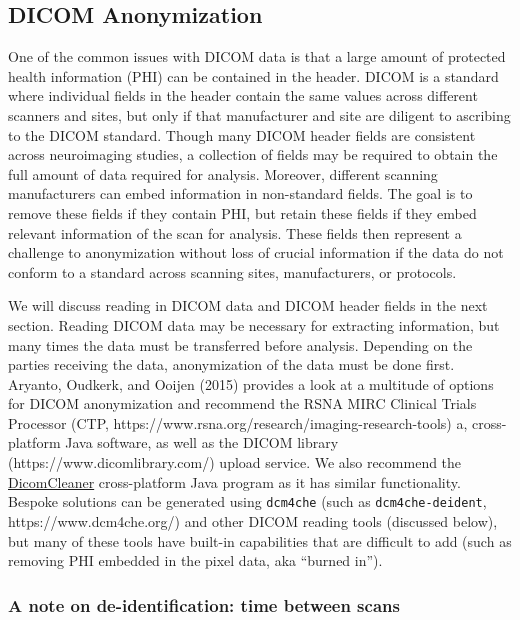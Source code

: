 \documentclass[]{elsarticle} %
\begin{document}
\hypertarget{dicom-anonymization}{%
\subsection{DICOM Anonymization}\label{dicom-anonymization}}

One of the common issues with DICOM data is that a large amount of protected health information (PHI) can be contained in the header. DICOM is a standard where individual fields in the header contain the same values across different scanners and sites, but only if that manufacturer and site are diligent to ascribing to the DICOM standard. Though many DICOM header fields are consistent across neuroimaging studies, a collection of fields may be required to obtain the full amount of data required for analysis. Moreover, different scanning manufacturers can embed information in non-standard fields. The goal is to remove these fields if they contain PHI, but retain these fields if they embed relevant information of the scan for analysis. These fields then represent a challenge to anonymization without loss of crucial information if the data do not conform to a standard across scanning sites, manufacturers, or protocols.

We will discuss reading in DICOM data and DICOM header fields in the next section. Reading DICOM data may be necessary for extracting information, but many times the data must be transferred before analysis. Depending on the parties receiving the data, anonymization of the data must be done first. Aryanto, Oudkerk, and Ooijen (2015) provides a look at a multitude of options for DICOM anonymization and recommend the RSNA MIRC Clinical Trials Processor (CTP, https://www.rsna.org/research/imaging-research-tools) a, cross-platform Java software, as well as the DICOM library (https://www.dicomlibrary.com/) upload service. We also recommend the \href{https://www.dclunie.com/pixelmed/software/webstart/DicomCleanerUsage.html}{DicomCleaner} cross-platform Java program as it has similar functionality. Bespoke solutions can be generated using \texttt{dcm4che} (such as \texttt{dcm4che-deident}, https://www.dcm4che.org/) and other DICOM reading tools (discussed below), but many of these tools have built-in capabilities that are difficult to add (such as removing PHI embedded in the pixel data, aka ``burned in'').

\hypertarget{a-note-on-de-identification-time-between-scans}{%
\subsubsection{A note on de-identification: time between scans}\label{a-note-on-de-identification-time-between-scans}}
\end{document}
